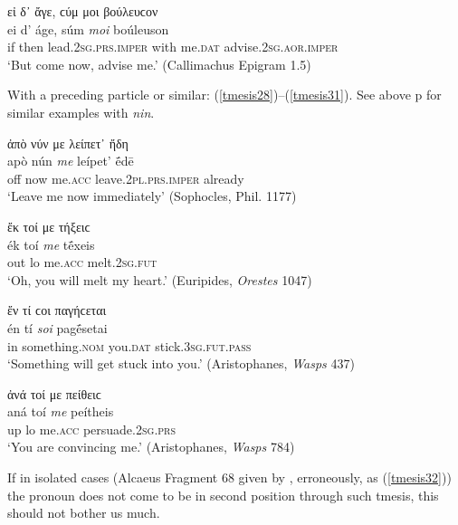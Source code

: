 \begin{exe}
\ex εἰ δ᾽ ἄγε, ϲύμ μοι βούλευϲον\\
\gll ei d' áge, súm \emph{moi} boúleuson\\
if then lead.\textsc{2sg.prs.imper} with me.\textsc{dat} advise.\textsc{2sg.aor.imper}\\
\trans `But come now, advise me.' (Callimachus Epigram 1.5)
\label{tmesis27}
\end{exe}

With a preceding particle or similar: (\ref{tmesis28})--(\ref{tmesis31}). See above p\pageref{nin} for similar examples with \textit{nin}.

\begin{exe}
\ex ἀπὸ νύν με λείπετ᾽ ἤδη\\
\gll apò nún \emph{me} leípet' ḗdē\\
off now me.\textsc{acc} leave.\textsc{2pl.prs.imper} already\\
\trans `Leave me now immediately' (Sophocles, Phil. 1177)
\label{tmesis28}
\end{exe}

\begin{exe}
\ex ἔκ τοί με τήξειϲ\\
\gll ék toí \emph{me} tḗxeis\\
out lo me.\textsc{acc} melt.\textsc{2sg.fut}\\
\trans `Oh, you will melt my heart.' (Euripides, \textit{Orestes} 1047)
\label{tmesis29}
\end{exe}

\begin{exe}
\ex ἔν τί ϲοι παγήϲεται\\
\gll én tí \emph{soi} pagḗsetai\\
in something.\textsc{nom} you.\textsc{dat} stick.\textsc{3sg.fut.pass}\\
\trans `Something will get stuck into you.' (Aristophanes, \textit{Wasps} 437)
\label{tmesis30}
\end{exe}

\begin{exe}
\ex ἀνά τοί με πείθειϲ\\
\gll aná toí \emph{me} peítheis\\
up lo me.\textsc{acc} persuade.\textsc{2sg.prs}\\
\trans `You are convincing me.' (Aristophanes, \textit{Wasps} 784)
\label{tmesis31}
\end{exe}

If in isolated cases (Alcaeus Fragment 68 given by \citealp{Bekker1833}, erroneously, as (\ref{tmesis32})) the pronoun does not come to be in second position through such tmesis, this should not bother us much.

